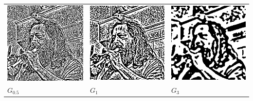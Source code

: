 \begin{tabular}{lll}
	\includegraphics{weiro-ga.png} &
	\includegraphics{weiro-gb.png} &
	\includegraphics{weiro-gc.png} \\
	$G_{0.5}$ &
	$G_{1}$ &
	$G_{3}$ \\
\end{tabular}

